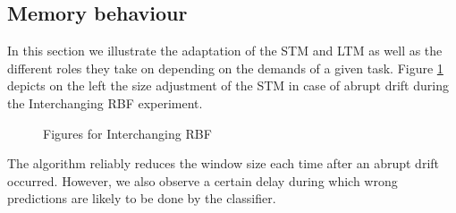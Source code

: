 \documentclass[conference]{IEEEtran}
\begin{document}
\subsection{Memory behaviour}
In this section we illustrate the adaptation of the STM and LTM as well as the different roles they take on depending on the demands of a given task.
Figure \ref{fig:abrupt} depicts on the left the size adjustment of the STM in case of abrupt drift during the Interchanging RBF experiment. 
\begin{figure}
\centering
	\vspace{0 pt}
\caption{Figures for Interchanging RBF}
\label{fig:abrupt}
\end{figure}
The algorithm reliably reduces the window size each time after an abrupt drift occurred.
However, we also observe a certain delay during which wrong predictions are likely to be done by the classifier. 
\end{document}
